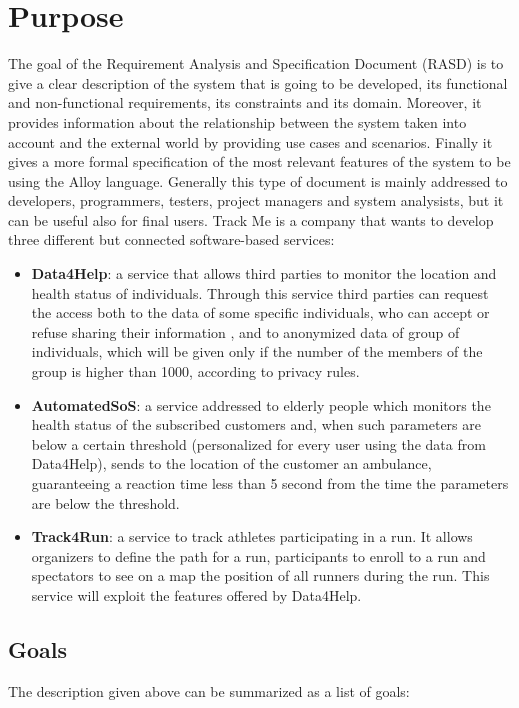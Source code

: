\section{Purpose}
The  goal of the Requirement Analysis and Specification Document (RASD) is to give a clear description of the system that is going to be developed, its functional and non-functional requirements, its constraints and its domain. Moreover, it provides information about the relationship between the system taken into account and the external world by providing use cases and scenarios. Finally it gives a more formal specification of the most relevant features of the system to be using the Alloy language.
Generally this type of document is mainly addressed to developers, programmers, testers, project managers and system analysists, but it can be useful also for final users.
Track Me is a company that wants to develop three different but connected software-based services:
\begin{itemize}
  \item \textbf{Data4Help}: a service that allows third parties to monitor the location and health status of individuals. Through this service third parties can request the access both to the data of some specific individuals, who can accept or refuse sharing their information , and to anonymized data of group of individuals, which will be given only if the number of the members of the group is higher than 1000, according to privacy rules.
  \item \textbf{AutomatedSoS}: a service addressed to elderly people which monitors the health status of the subscribed customers and, when such parameters are below a certain threshold (personalized for every user using the data from Data4Help), sends to the location of the customer an ambulance, guaranteeing a reaction time less than 5 second from the time the parameters are below the threshold.
  \clearpage
  \item \textbf{Track4Run}: a service to track athletes participating in a run. It allows organizers to define the path for a run, participants to enroll to a run and spectators to see on a map the position of all runners during the run. This service will exploit the features offered by Data4Help.
\end{itemize}

\subsection{Goals}
The description given above can be summarized as a list of goals:
